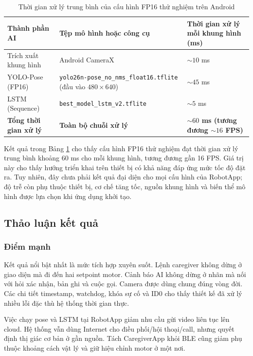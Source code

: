 \begin{table}[htbp]
\centering
\caption{Thời gian xử lý trung bình của cấu hình FP16 thử nghiệm trên Android}
\label{tab:speed_benchmark}
\small
\begin{tabularx}{\textwidth}{|p{3.3cm}|X|p{4.1cm}|}
\hline
\textbf{Thành phần AI} & \textbf{Tệp mô hình hoặc công cụ} & \textbf{Thời gian xử lý mỗi khung hình (ms)} \\
\hline
Trích xuất khung hình & Android CameraX & $\sim 10$ ms \\
\hline
YOLO-Pose (FP16) & \texttt{yolo26n-pose\_no\_nms\_float16.tflite} (đầu vào $480\times640$) & $\sim 45$ ms \\
\hline
LSTM (Sequence) & \texttt{best\_model\_lstm\_v2.tflite} & $\sim 5$ ms \\
\hline
\textbf{Tổng thời gian xử lý} & \textbf{Toàn bộ chuỗi xử lý} & \textbf{$\sim 60$ ms (tương đương $\sim 16$ FPS)} \\
\hline
\end{tabularx}
\end{table}

Kết quả trong Bảng \ref{tab:speed_benchmark} cho thấy cấu hình FP16 thử nghiệm đạt thời gian xử lý trung bình khoảng 60 ms cho mỗi khung hình, tương đương gần 16 FPS. Giá trị này cho thấy hướng triển khai trên thiết bị có khả năng đáp ứng mức tốc độ đặt ra. Tuy nhiên, đây chưa phải kết quả đại diện cho mọi cấu hình của RobotApp; độ trễ còn phụ thuộc thiết bị, cơ chế tăng tốc, nguồn khung hình và biến thể mô hình được lựa chọn khi ứng dụng khởi tạo.

\subsection{Thảo luận kết quả}

\subsubsection{Điểm mạnh}

Kết quả nổi bật nhất là mức tích hợp xuyên suốt. Lệnh caregiver không dừng ở giao diện mà đi đến hai setpoint motor. Cảnh báo AI không dừng ở nhãn mà nối với hỏi xác nhận, bản ghi và cuộc gọi. Camera được dùng chung đúng vòng đời. Các chi tiết timestamp, watchdog, khóa sự cố và ID0 cho thấy thiết kế đã xử lý nhiều lỗi đặc thù hệ thống thời gian thực.

Việc chạy pose và LSTM tại RobotApp giảm nhu cầu gửi video liên tục lên cloud. Hệ thống vẫn dùng Internet cho điều phối/hội thoại/call, nhưng quyết định thị giác cơ bản ở gần nguồn. Tách CaregiverApp khỏi BLE cũng giảm phụ thuộc khoảng cách vật lý và giữ hiệu chỉnh motor ở một nơi.

